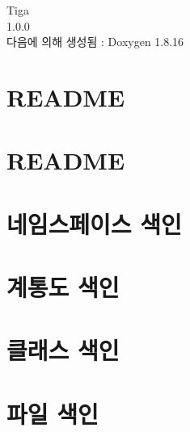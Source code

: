 \let\mypdfximage\pdfximage\def\pdfximage{\immediate\mypdfximage}\documentclass[twoside]{book}
\newcommand{\+}{\discretionary{\mbox{\scriptsize$\hookleftarrow$}}{}{}}
\newcommand{\clearemptydoublepage}{%
  \newpage{\pagestyle{empty}\cleardoublepage}%
}
\begin{document}
\hypersetup{pageanchor=false,
             bookmarksnumbered=true,
             pdfencoding=unicode
            }
\begin{titlepage}
\vspace*{7cm}
\begin{center}%
{\Large Tiga \\[1ex]\large 1.\+0.\+0 }\\
\vspace*{1cm}
{\large 다음에 의해 생성됨 \+:  Doxygen 1.8.16}\\
\end{center}
\end{titlepage}
\clearemptydoublepage
{}
\tableofcontents
\clearemptydoublepage
{}
\hypersetup{pageanchor=true}

\chapter{R\+E\+A\+D\+ME}
\label{md__assets__plugins__spine_spine-unity__modules__shaders__sprite__r_e_a_d_m_e}

\chapter{R\+E\+A\+D\+ME}
\label{md__assets__plugins__spine_spine-unity__modules__timeline__documentation__r_e_a_d_m_e}

\chapter{네임스페이스 색인}

\chapter{계통도 색인}

\chapter{클래스 색인}

\chapter{파일 색인}

\end{document}
